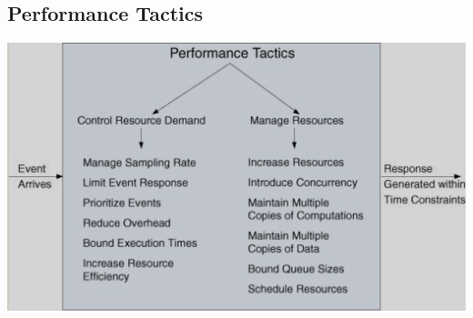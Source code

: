 \documentclass[a4paper]{article}
\begin{document}
\subsection{Performance Tactics}
\includegraphics[scale=0.6]{images/zxc.png}
\end{document}
